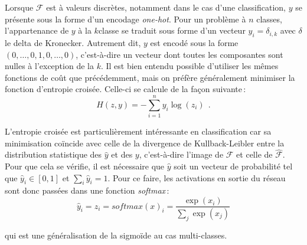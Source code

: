 Lorsque $\mathcal{F}$ est à valeurs discrètes, notamment dans le cas d'une classification, $y$ se présente sous la forme d'un encodage \emph{one-hot}. Pour un problème à $n$ classes, l'appartenance de $y$ à la $k$\ieme classe se traduit sous forme d'un vecteur $y_i = \delta_{i,k}$ avec $\delta$ le delta de Kronecker. Autrement dit, $y$ est encodé sous la forme $(0, \dots, 0, 1, 0, \dots, 0)$, c'est-à-dire un vecteur dont toutes les composantes sont nulles à l'exception de la $k$\ieme. Il est bien entendu possible d'utiliser les mêmes fonctions de coût que précédemment, mais on préfère généralement minimiser la fonction d'entropie croisée. Celle-ci se calcule de la façon suivante\,:
\begin{equation}
  H(z,y) = -\sum_{i=1}^n y_i \log(z_i)~~.
\end{equation}

L'entropie croisée est particulièrement intéressante en classification car sa minimisation coïncide avec celle de la divergence de Kullback-Leibler entre la distribution statistique des $\hat{y}$ et des $y$, c'est-à-dire l'image de $\mathcal{F}$ et celle de $\hat{\mathcal{F}}$. Pour que cela se vérifie, il est nécessaire que $\hat{y}$ soit un vecteur de probabilité tel que $\hat{y}_i \in [0,1]$ et $\sum_i \hat{y}_i = 1$. Pour ce faire, les activations en sortie du réseau sont donc passées dans une fonction \emph{softmax}\,:
\begin{equation}
\hat{y}_i = z_i = \mathit{softmax}(x)_i = \frac{\exp(x_i)}{\sum_j \exp(x_j)}
\end{equation}

qui est une généralisation de la sigmoïde au cas multi-classes.


